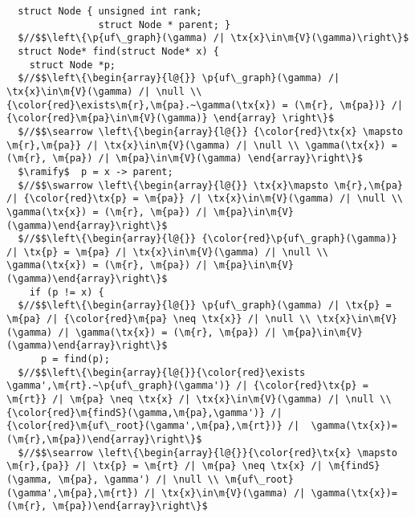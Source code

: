 
\begin{lstlisting}
  struct Node { unsigned int rank;
                struct Node * parent; }
  $//$$\left\{\p{uf\_graph}(\gamma) /| \tx{x}\in\m{V}(\gamma)\right\}$
  struct Node* find(struct Node* x) {
    struct Node *p;
  $//$$\left\{\begin{array}{l@{}} \p{uf\_graph}(\gamma) /| \tx{x}\in\m{V}(\gamma) /| \null \\ {\color{red}\exists\m{r},\m{pa}.~\gamma(\tx{x}) = (\m{r}, \m{pa})} /| {\color{red}\m{pa}\in\m{V}(\gamma)} \end{array} \right\}$
  $//$$\searrow \left\{\begin{array}{l@{}} {\color{red}\tx{x} \mapsto \m{r},\m{pa}} /| \tx{x}\in\m{V}(\gamma) /| \null \\ \gamma(\tx{x}) = (\m{r}, \m{pa}) /| \m{pa}\in\m{V}(\gamma) \end{array}\right\}$
  $\ramify$  p = x -> parent;
  $//$$\swarrow \left\{\begin{array}{l@{}} \tx{x}\mapsto \m{r},\m{pa} /| {\color{red}\tx{p} = \m{pa}} /| \tx{x}\in\m{V}(\gamma) /| \null \\ \gamma(\tx{x}) = (\m{r}, \m{pa}) /| \m{pa}\in\m{V}(\gamma)\end{array}\right\}$
  $//$$\left\{\begin{array}{l@{}} {\color{red}\p{uf\_graph}(\gamma)} /| \tx{p} = \m{pa} /| \tx{x}\in\m{V}(\gamma) /| \null \\ \gamma(\tx{x}) = (\m{r}, \m{pa}) /| \m{pa}\in\m{V}(\gamma)\end{array}\right\}$
    if (p != x) { 
  $//$$\left\{\begin{array}{l@{}} \p{uf\_graph}(\gamma) /| \tx{p} = \m{pa} /| {\color{red}\m{pa} \neq \tx{x}} /| \null \\ \tx{x}\in\m{V}(\gamma) /| \gamma(\tx{x}) = (\m{r}, \m{pa}) /| \m{pa}\in\m{V}(\gamma)\end{array}\right\}$
      p = find(p);
  $//$$\left\{\begin{array}{l@{}}{\color{red}\exists \gamma',\m{rt}.~\p{uf\_graph}(\gamma')} /| {\color{red}\tx{p} = \m{rt}} /| \m{pa} \neq \tx{x} /| \tx{x}\in\m{V}(\gamma) /| \null \\ {\color{red}\m{findS}(\gamma,\m{pa},\gamma')} /| {\color{red}\m{uf\_root}(\gamma',\m{pa},\m{rt})} /|  \gamma(\tx{x})=(\m{r},\m{pa})\end{array}\right\}$
  $//$$\searrow \left\{\begin{array}{l@{}}{\color{red}\tx{x} \mapsto \m{r},{pa}} /| \tx{p} = \m{rt} /| \m{pa} \neq \tx{x} /| \m{findS}(\gamma, \m{pa}, \gamma') /| \null \\ \m{uf\_root}(\gamma',\m{pa},\m{rt}) /| \tx{x}\in\m{V}(\gamma) /| \gamma(\tx{x})=(\m{r}, \m{pa})\end{array}\right\}$

\end{lstlisting}
